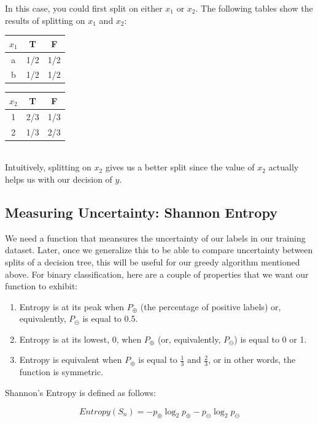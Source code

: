 \documentclass[12pt]{article}
\begin{document}
In this case, you could first split on either $x_1$ or $x_2$. The following tables show the results of splitting on $x_1$ and $x_2$:\\

\begin{tabular}{|c|c|c|}
	\hline
	$x_1$ & T & F\\
	\hline
	a & 1/2 & 1/2\\
	\hline
	b & 1/2 & 1/2\\
	\hline
\end{tabular} \quad
\begin{tabular}{|c|c|c|}
	\hline
	$x_2$ & T & F\\
	\hline
	1 & 2/3 & 1/3\\
	\hline
	2 & 1/3 & 2/3 \\
	\hline
\end{tabular}\\

Intuitively, splitting on $x_2$ gives us a better split since the value of $x_2$ actually helps us with our decision of $y$.

\subsection{Measuring Uncertainty: Shannon Entropy}

We need a function that meansures the uncertainty of our labels in our training dataset. Later, once we generalize this to be able to compare uncertainty between splits of a decision tree, this will be useful for our greedy algorithm mentioned above. For binary classification, here are a couple of properties that we want our function to exhibit:

\begin{enumerate}[label=(\alph*)]
	\item Entropy is at its peak when $P_{\oplus}$ (the percentage of positive labels) or, equivalently, $P_{\ominus}$ is equal to 0.5.
	\item Entropy is at its lowest, 0, when $P_{\oplus}$ (or, equivalently, $P_{\ominus}$) is equal to 0 or 1.
	\item Entropy is equivalent when $P_{\oplus}$ is equal to $\frac 1 3$ and $\frac 2 3$, or in other words, the function is symmetric.
\end{enumerate}

Shannon's Entropy is defined as follows:

\[ Entropy(S_n) = -p_{\oplus}\log_2p_{\oplus} - p_{\ominus}\log_2p_{\ominus}\]
\end{document}
